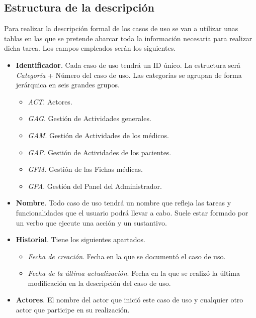 			\subsection{Estructura de la descripción} %
			\label{sub:estructura_de_la_descripcion}

				Para realizar la descripción formal de los casos de uso se van a utilizar unas tablas en las que se pretende abarcar toda la información necesaria para realizar dicha tarea. Los campos empleados serán los siguientes.

				\begin{itemize}
					\item \textbf{Identificador}. Cada caso de uso tendrá un ID único. La estructura será \textit{Categoría} + Número del caso de uso. Las categorías se agrupan de forma jerárquica en seis grandes grupos.
						\begin{itemize}
							\item \textit{ACT}. Actores.
							\item \textit{GAG}. Gestión de Actividades generales.
							\item \textit{GAM}. Gestión de Actividades de los médicos.
							\item \textit{GAP}. Gestión de Actividades de los pacientes.
							\item \textit{GFM}. Gestión de las Fichas médicas.
							\item \textit{GPA}. Gestión del Panel del Administrador.
						\end{itemize}

					\item \textbf{Nombre}. Todo caso de uso tendrá un nombre que refleja las tareas y funcionalidades que el usuario podrá llevar a cabo. Suele estar formado por un verbo que ejecute una acción y un sustantivo.

					\item \textbf{Historial}. Tiene los siguientes apartados.
						\begin{itemize}
							\item \textit{Fecha de creación}. Fecha en la que se documentó el caso de uso.
							\item \textit{Fecha de la última actualización}. Fecha en la que se realizó la última modificación en la descripción del caso de uso.
						\end{itemize}

					\item \textbf{Actores}. El nombre del actor que inició este caso de uso y cualquier otro actor que participe en su realización.  


\end{itemize}

